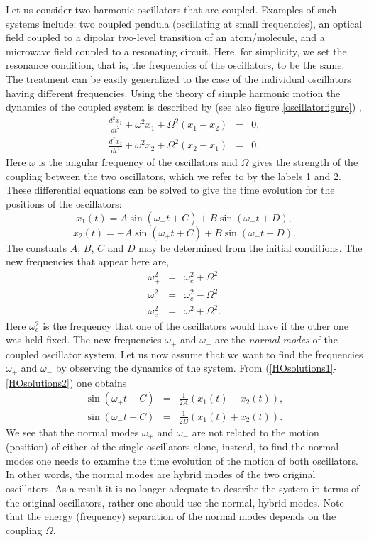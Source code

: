 \documentclass[12pt]{iopart}
\begin{document}
Let us consider two harmonic oscillators that are coupled. Examples of such systems include: two coupled pendula (oscillating at small frequencies), an optical field coupled to a dipolar two-level transition of an atom/molecule, and a microwave field coupled to a resonating circuit. Here, for simplicity, we set the resonance condition, that is, the frequencies of the oscillators, to be the same. The treatment can be easily generalized to the case of the individual oscillators having different frequencies. Using the theory of simple harmonic motion the dynamics of the coupled system is described by (see also figure \ref{oscillatorfigure}) \cite{Novotny_AJP_2010_78_1199}, 
\begin{eqnarray}
\frac{d^2 x_1}{dt^2} + \omega^2 x_1 + \Omega^2 (x_1 - x_2) &=& 0 , \\
\frac{d^2 x_2}{dt^2} + \omega^2 x_2 + \Omega^2 (x_2 - x_1) &=& 0 . 
\end{eqnarray}
Here $\omega$ is the angular frequency of the oscillators and $\Omega$ gives the strength of the coupling between the two oscillators, which we refer to by the labels 1 and 2. These differential equations can be solved to give the time evolution for the positions of the oscillators:
\begin{equation}
x_1(t) = A \sin (\omega_+ t + C) + B \sin (\omega_- t + D) ,  \label{HOsolutions1}
\end{equation}
\begin{equation}
x_2(t) = - A \sin (\omega_+ t + C) + B \sin (\omega_- t + D) . \label{HOsolutions2} 
\end{equation}
The constants $A$, $B$, $C$ and $D$ may be determined from the initial conditions. The new frequencies that appear here are, 
\begin{eqnarray}
\omega_+^2 &=& \omega_c^2 + \Omega^2 \\
\omega_-^2 &=& \omega_c^2 - \Omega^2 \\
\omega_c^2 &=& \omega^2 + \Omega^2  .
\end{eqnarray}
Here $\omega_c^2$ is the frequency that one of the oscillators would have if the other one was held fixed. The new frequencies $\omega_+$ and $\omega_-$ are the {\it normal modes} of the coupled oscillator system. Let us now assume that we want to find the frequencies $\omega_+$ and $\omega_-$ by observing the dynamics of the system. From (\ref{HOsolutions1}-\ref{HOsolutions2}) one obtains
\begin{eqnarray}
\sin (\omega_+ t + C) &=& \frac{1}{2A} (x_1(t) - x_2(t)) , \\
\sin (\omega_- t + C) &=& \frac{1}{2B} (x_1(t) + x_2(t)) .
\end{eqnarray} 
We see that the normal modes $\omega_+$ and $\omega_-$ are not related to the motion (position) of either of the single oscillators alone, instead, to find the normal modes one needs to examine the time evolution of the motion of both oscillators. In other words, the normal modes are hybrid modes of the two original oscillators. As a result it is no longer adequate to describe the system in terms of the original oscillators, rather one should use the normal, hybrid modes. Note that the energy (frequency) separation of the normal modes depends on the coupling $\Omega$. 
\end{document}
